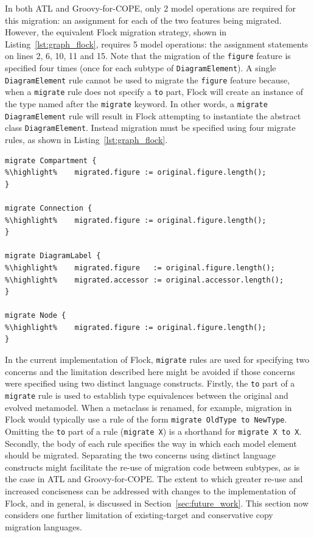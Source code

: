 In both ATL and Groovy-for-COPE, only 2 model operations are required for this migration: an assignment for each of the two features being migrated. However, the equivalent Flock migration strategy, shown in Listing~\ref{lst:graph_flock}, requires 5 model operations: the assignment statements on lines 2, 6, 10, 11 and 15. Note that the migration of the \texttt{figure} feature is specified four times (once for each subtype of \texttt{DiagramElement}). A single \texttt{DiagramElement} rule cannot be used to migrate the \texttt{figure} feature because, when a \texttt{migrate} rule does not specify a \texttt{to} part, Flock will create an instance of the type named after the \texttt{migrate} keyword. In other words, a \texttt{migrate DiagramElement} rule will result in Flock attempting to instantiate the abstract class \texttt{DiagramElement}. Instead migration must be specified using four migrate rules, as shown in Listing~\ref{lst:graph_flock}.

\begin{lstlisting}[float=tbp, caption=Simplified GMF Graph model migration in Flock, label=lst:graph_flock, language=Flock, tabsize=2]
migrate Compartment {
%\highlight%	migrated.figure := original.figure.length();
}

migrate Connection {
%\highlight%	migrated.figure := original.figure.length();
}

migrate DiagramLabel {
%\highlight%	migrated.figure   := original.figure.length();
%\highlight%	migrated.accessor := original.accessor.length();
}

migrate Node {
%\highlight%	migrated.figure := original.figure.length();
}
\end{lstlisting}

In the current implementation of Flock, \texttt{migrate} rules are used for specifying two concerns and the limitation described here might be avoided if those concerns were specified using two distinct language constructs. Firstly, the \texttt{to} part of a \texttt{migrate} rule is used to establish type equivalences between the original and evolved metamodel. When a metaclass is renamed, for example, migration in Flock would typically use a rule of the form \texttt{migrate OldType to NewType}. Omitting the \texttt{to} part of a rule (\texttt{migrate X}) is a shorthand for \texttt{migrate X to X}. Secondly, the body of each rule specifies the way in which each model element should be migrated. Separating the two concerns using distinct language constructs might facilitate the re-use of migration code between subtypes, as is the case in ATL and Groovy-for-COPE. The extent to which greater re-use and increased conciseness can be addressed with changes to the implementation of Flock, and in general, is discussed in Section~\ref{sec:future_work}. This section now considers one further limitation of existing-target and conservative copy migration languages.

